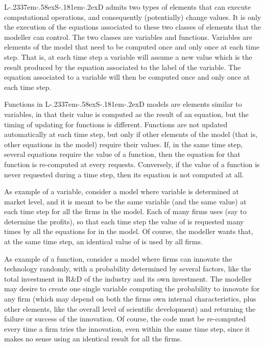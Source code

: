 \documentclass [11pt,a4paper] {book}
\def\LsD{{L\kern-.2337em\lower-.58ex\hbox{S}\kern-.181em\lower-.2ex\hbox{D}}\xspace}
\begin{document}
\LsD admits two types of elements that can execute computational operations, and consequently (potentially) change values. It is only the execution of the equations associated to these two classes of elements that the modeller can control. The two classes are variables and functions. Variables are elements of the model that need to be computed once and only once at each time step. That is, at each time step a variable will assume a new value which is the result produced by the equation associated to the label of the variable. The equation associated to a variable will then be computed once and only once at each time step.

Functions in \LsD models are elements similar to variables, in that their value is computed as the result of an equation, but the timing of updating for functions is different. Functions are not updated automatically at each time step, but only if other elements of the model (that is, other equations in the model) require their values. If, in the same time step, several equations require the value of a function, then the equation for that function is re-computed at every requests. Conversely, if the value of a function is never requested during a time step, then its equation is not computed at all.

As example of a variable, consider a model where variable  is determined at market level, and it is meant to be the same variable (and the same value) at each time step for all the firms in the model. Each of many firms uses  (say to determine the profits), so that
each time step the value of  is requested many times by all the equations for  in the model. Of course, the modeller wants that, at the same time step, an identical value of  is used by all
firms.

As example of a function, consider a model where firms can innovate the technology
randomly, with a probability determined by several factors, like the total investment in
R\&D of the industry and its own investment. The modeller may desire to create one
single variable computing the probability to innovate for any firm (which may depend on both the firms own internal characteristics, plus other elements, like the overall level of scientific development) and returning the
failure or success of the innovation. Of course, the code must be re-computed every time
a firm tries the innovation, even within the same time step, since it makes no sense
using an identical result for all the firms.
\end{document}
